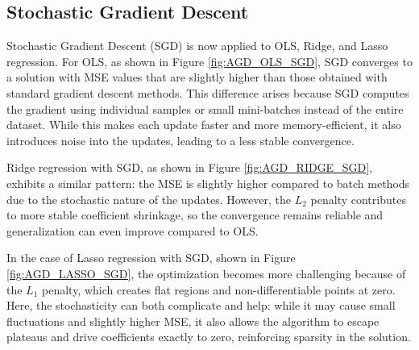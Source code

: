 \documentclass[
    article
 reprint,            %
 amsmath,amssymb,
 aps,
]{revtex4-2}
\begin{document}
\subsection{Stochastic Gradient Descent}
\label{Stochastic Gradient Descent}
Stochastic Gradient Descent (SGD) is now applied to OLS, Ridge, and Lasso regression.
For OLS, as shown in Figure \ref{fig:AGD_OLS_SGD}, SGD converges to a solution with MSE values that are slightly higher than those obtained with standard gradient descent methods. 
This difference arises because SGD computes the gradient using individual samples or small mini-batches instead of the entire dataset. While this makes each update faster and more memory-efficient, it also introduces noise into the updates, leading to a less stable convergence.



Ridge regression with SGD, as shown in Figure \ref{fig:AGD_RIDGE_SGD}, exhibits a similar pattern: the MSE is slightly higher compared to batch methods due to the stochastic nature of the updates. However, the $L_2$ penalty contributes to more stable coefficient shrinkage, so the convergence remains reliable and generalization can even improve compared to OLS.



In the case of Lasso regression with SGD, shown in Figure \ref{fig:AGD_LASSO_SGD}, the optimization becomes more challenging because of the $L_1$ penalty, which creates flat regions and non-differentiable points at zero. Here, the stochasticity can both complicate and help: while it may cause small fluctuations and slightly higher MSE, it also allows the algorithm to escape plateaus and drive coefficients exactly to zero, reinforcing sparsity in the solution.


\end{document}
